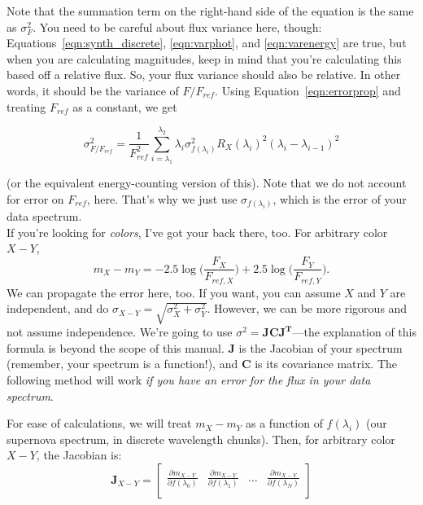 Note that the summation term on the right-hand side of the equation is the same as $\sigma_{F}^{2}$. You need to be careful about flux variance here, though: Equations~\ref{eqn:synth_discrete},   \ref{eqn:varphot}, and \ref{eqn:varenergy} are true, but when you are calculating magnitudes, keep in mind that you're calculating this based off a relative flux. So, your flux variance should also be relative. In other words, it should be the variance of $F/F_{ref}$. Using Equation~\ref{eqn:errorprop} and treating $F_{ref}$ as a constant, we get

\begin{equation}
    \sigma^{2}_{F/F_{ref}} = \frac{1}{F_{ref}^{2}}\sum_{i=\lambda_{1}}^{\lambda_{2}} \lambda_{i}\sigma_{f(\lambda_{i})}^{2} R_{X}(\lambda_{i})^{2}(\lambda_{i} - \lambda_{i-1})^{2} 
\end{equation}

(or the equivalent energy-counting version of this). Note that we do not account for error on $F_{ref}$, here. That's why we just use $\sigma_{f(\lambda_{i})}$, which is the error of your data spectrum. \\

If you're looking for \textit{colors}, I've got your back there, too. For arbitrary color $X-Y$,
\begin{equation}
    m_{X} - m_{Y} = -2.5\log \Big( \frac{F_{X}}{F_{ref,X}} \Big) + 2.5\log \Big( \frac{F_{Y}}{F_{ref,Y}} \Big).
\end{equation}
We can propagate the error here, too. If you want, you can assume $X$ and $Y$ are independent, and do $\sigma_{X-Y} = \sqrt{\sigma_{X}^{2} + \sigma_{Y}^{2}}$. However, we can be more rigorous and not assume independence. We're going to use $\sigma^{2} = \mathbf{JCJ^{T}}$---the explanation of this formula is beyond the scope of this manual. $\mathbf{J}$ is the Jacobian of your spectrum (remember, your spectrum is a function!), and $\mathbf{C}$ is its covariance matrix. The following method will work \textit{if you have an error for the flux in your data spectrum}.

For ease of calculations, we will treat $m_{X}-m_{Y}$ as a function of $f(\lambda_{i})$ (our supernova spectrum, in discrete wavelength chunks). Then, for arbitrary color $X-Y$, the Jacobian is:
\begin{equation}
\label{eqn:jac2}
\mathbf{J}_{X-Y} = 
\begin{bmatrix}
    
        \frac{\partial m_{X-Y}}{\partial f(\lambda_{0})} & \frac{\partial m_{X-Y}}{\partial f (\lambda_{1})} & \dots & \frac{\partial m_{X-Y}}{\partial f(\lambda_{N})} \\
    
\end{bmatrix}
\end{equation}

